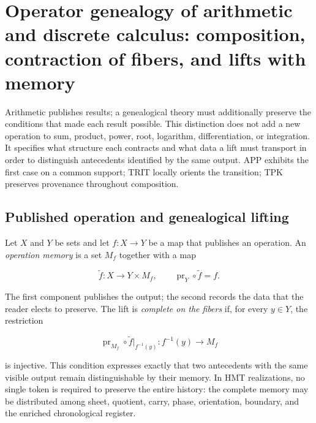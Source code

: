 
\chapter[Arithmetic, discrete calculus and genealogical memory]{Operator
genealogy of arithmetic and discrete calculus: composition, contraction
of fibers, and lifts with memory}
\label{chap:genealogia-operaciones-rev2}

Arithmetic publishes results; a genealogical theory must additionally preserve
the conditions that made each result possible. This distinction
does not add a new operation to sum, product, power, root,
logarithm, differentiation, or integration. It specifies what structure
each contracts and what data a lift must transport in order to distinguish
antecedents identified by the same output. APP exhibits the first case on
a common support; TRIT locally orients the transition; TPK preserves
provenance throughout composition.

\section{Published operation and genealogical lifting}

Let \(X\) and \(Y\) be sets and let \(f:X\to Y\) be a map that publishes
an operation. An \emph{operation memory} is a set \(M_f\) together
with a map

\begin{equation}
 \widetilde f:X\longrightarrow Y\times M_f,
 \qquad
 \operatorname{pr}_Y\circ\widetilde f=f.
 \label{eq:levantamiento-genealogico-operacion-rev2}
\end{equation}

The first component publishes the output; the second records the data that the
reader elects to preserve. The lift is \emph{complete on the fibers}
if, for every \(y\in Y\), the restriction

\[
 \operatorname{pr}_{M_f}\circ\widetilde f\big|_{f^{-1}(y)}
 :f^{-1}(y)\longrightarrow M_f
\]

is injective. This condition expresses exactly that two antecedents with the same visible output remain distinguishable by their memory. In HMT realizations, no single token is required to preserve the entire history: the complete memory may be distributed among sheet, quotient, carry, phase, orientation, boundary, and the enriched chronological register.

